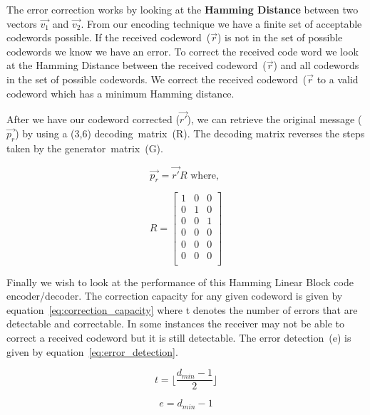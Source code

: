 \documentclass[12pt]{article}
\begin{document}
The error correction works by looking at the \textbf{Hamming Distance} between
two vectors $\vec{v_1}$ and $\vec{v_2}$. From our encoding technique we have
a finite set of acceptable codewords possible. If the received 
codeword~($\vec{r}$) is not in the set of possible codewords we know we have
an error. To correct the received code word we look at the Hamming
Distance between the received codeword~($\vec{r}$) and all codewords in the
set of possible codewords. We correct the received codeword~($\vec{r}$ to a
valid codeword which has a minimum Hamming distance. ~\cite{Stallings2014a}

After we have our codeword corrected ($\vec{r'}$), we can retrieve the 
original message ($\vec{p_r}$) by using a (3,6) decoding~matrix~(R). 
The decoding matrix reverses the steps taken by the generator~matrix~(G). 

\begin{equation}
    \vec{p_r}=\vec{r'}R \text{ where, }
    \label{eq:decoder}   
\end{equation}

$$
    R=
    \begin{bmatrix}
        1 & 0 & 0 \\
        0 & 1 & 0 \\
        0 & 0 & 1 \\
        0 & 0 & 0 \\
        0 & 0 & 0 \\
        0 & 0 & 0 \\
    \end{bmatrix}
$$

Finally we wish to look at the performance of this Hamming Linear Block code
encoder/decoder. The correction capacity for any given codeword is given by
equation~\ref{eq:correction_capacity} where t denotes the number of 
errors that are detectable and correctable. In some instances the receiver may
not be able to correct a received codeword but it is still detectable. 
The error detection~(e) is given by equation~\ref{eq:error_detection}.

\begin{equation}
    t=\lfloor{\frac{d_{min}-1}{2}}\rfloor
    \label{eq:correction_capacity}   
\end{equation}

\begin{equation}
    e={d_{min}-1}
    \label{eq:error_detection}   
\end{equation}
\end{document}
